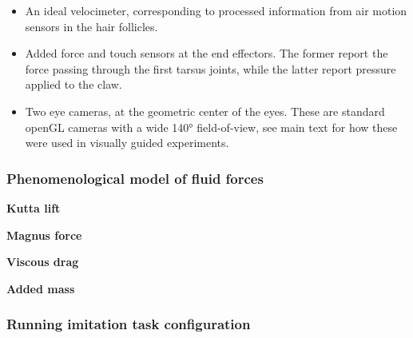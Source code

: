 \documentclass[sn-mathphys-num]{sn-jnl}%
\theoremstyle{thmstyleone}%
\theoremstyle{thmstyletwo}%
\theoremstyle{thmstylethree}%
\begin{document}
\begin{appendices}
\begin{itemize}
\begin{itemize}
			\item 
			An ideal velocimeter, corresponding to processed information from air motion sensors in the hair follicles.
			
			\item Added force and touch sensors at the end effectors. The former report the force passing through the first tarsus joints, while the latter report pressure applied to the claw.
			
			
			\item Two eye cameras, at the geometric center of the eyes. 
			These are standard openGL cameras with a wide 140° field-of-view, see main text for how these were used in visually guided experiments.
		\end{itemize}
\end{itemize}



\subsubsection{Phenomenological model of fluid forces}  \label{sec:fluid_model}


\textbf{Kutta lift}

\textbf{Magnus force}


\textbf{Viscous drag}


\textbf{Added mass}


\subsubsection{Running imitation task configuration}


\end{appendices}
\end{document}
